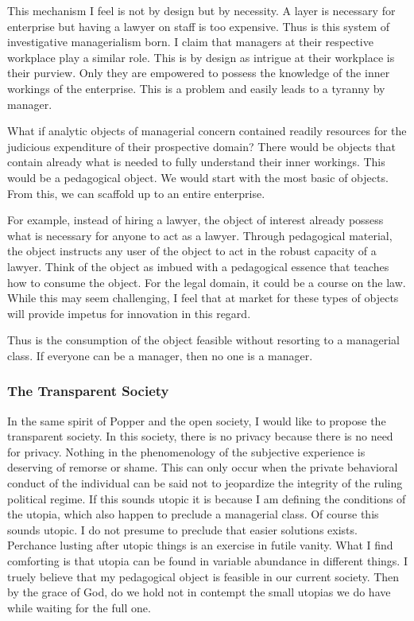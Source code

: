 \documentclass[12pt]{article}
\begin{document}
This mechanism I feel is not by design but by necessity.
A layer is necessary for enterprise but having a lawyer on staff is too expensive.
Thus is this system of investigative managerialism born.
I claim that managers at their respective workplace play a similar role.
This is by design as intrigue at their workplace is their purview.
Only they are empowered to possess the knowledge of the inner workings of the enterprise.
This is a problem and easily leads to a tyranny by manager.

What if analytic objects of managerial concern contained readily resources for the judicious expenditure of their prospective domain?
There would be objects that contain already what is needed to fully understand their inner workings.
This would be a pedagogical object.
We would start with the most basic of objects.
From this, we can scaffold up to an entire enterprise.

For example, instead of hiring a lawyer, the object of interest already possess what is necessary for anyone to act as a lawyer.
Through pedagogical material, the object instructs any user of the object to act in the robust capacity of a lawyer.
Think of the object as imbued with a pedagogical essence that teaches how to consume the object.
For the legal domain, it could be a course on the law.
While this may seem challenging, I feel that at market for these types of objects will provide impetus for innovation in this regard.

Thus is the consumption of the object feasible without resorting to a managerial class.
If everyone can be a manager, then no one is a manager.

\subsubsection{The Transparent Society}
In the same spirit of Popper and the open society, I would like to propose the transparent society.
In this society, there is no privacy because there is no need for privacy.
Nothing in the phenomenology of the subjective experience is deserving of remorse or shame.
This can only occur when the private behavioral conduct of the individual can be said not to jeopardize the integrity of the ruling political regime.
If this sounds utopic it is because I am defining the conditions of the utopia, which also happen to preclude a managerial class.
Of course this sounds utopic.
I do not presume to preclude that easier solutions exists.
Perchance lusting after utopic things is an exercise in futile vanity.
What I find comforting is that utopia can be found in variable abundance in different things.
I truely believe that my pedagogical object is feasible in our current society.
Then by the grace of God, do we hold not in contempt the small utopias we do have while waiting for the full one.
\end{document}
